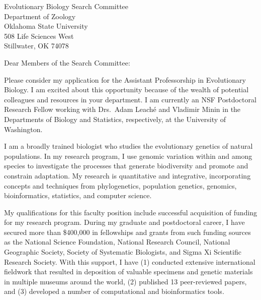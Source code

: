 \documentclass[letterpaper, 10pt]{letter}
\begin{document}
\begin{letter}{Evolutionary Biology Search Committee \\
                     Department of Zoology \\
                     Oklahoma State University \\
                     508 Life Sciences West \\
                     Stillwater, OK 74078}
\opening{Dear Members of the Search Committee:}
Please consider my application for the Assistant Professorship in Evolutionary
Biology.
I am excited about this opportunity because of the wealth of potential
colleagues and resources in your department.
I am currently an NSF Postdoctoral Research Fellow working with Drs.\ Adam
Leach\'{e} and Vladimir Minin in the Departments of Biology and
Statistics, respectively, at the University of Washington.

I am a broadly trained biologist who studies the evolutionary genetics of
natural populations.
In my research program, I use genomic variation within and among species to
investigate the processes that generate biodiversity and promote and constrain
adaptation.
My research is quantitative and integrative, incorporating concepts and
techniques from phylogenetics, population genetics, genomics, bioinformatics,
statistics, and computer science.

My qualifications for this faculty position include successful acquisition
of funding for my research program.
During my graduate and postdoctoral career, I have secured more than
\$400,000 in fellowships and grants from such funding sources as the 
National Science Foundation,
National Research Council,
National Geographic Society,
Society of Systematic Biologists, and
Sigma Xi Scientific Research Society.
With this support, I have
(1) conducted extensive international fieldwork that resulted in
deposition of valuable specimens and genetic materials in multiple
museums around the world,
(2) published 13 peer-reviewed papers, and
(3) developed a number of computational and bioinformatics tools.


\end{letter}
\end{document}
